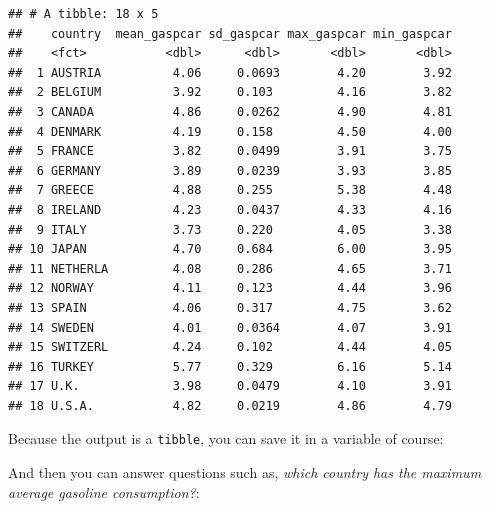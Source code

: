 \documentclass[]{gitbook}
\newenvironment{Shaded}{\begin{snugshade}}{\end{snugshade}}
\newcommand{\DataTypeTok}[1]{\textcolor[rgb]{0.13,0.29,0.53}{#1}}
\newcommand{\KeywordTok}[1]{\textcolor[rgb]{0.13,0.29,0.53}{\textbf{#1}}}
\newcommand{\NormalTok}[1]{#1}
\newcommand{\OperatorTok}[1]{\textcolor[rgb]{0.81,0.36,0.00}{\textbf{#1}}}
\newcommand{\StringTok}[1]{\textcolor[rgb]{0.31,0.60,0.02}{#1}}
\theoremstyle{definition}
\theoremstyle{definition}
\theoremstyle{definition}
\theoremstyle{remark}
\begin{document}
\begin{verbatim}
## # A tibble: 18 x 5
##    country  mean_gaspcar sd_gaspcar max_gaspcar min_gaspcar
##    <fct>           <dbl>      <dbl>       <dbl>       <dbl>
##  1 AUSTRIA          4.06     0.0693        4.20        3.92
##  2 BELGIUM          3.92     0.103         4.16        3.82
##  3 CANADA           4.86     0.0262        4.90        4.81
##  4 DENMARK          4.19     0.158         4.50        4.00
##  5 FRANCE           3.82     0.0499        3.91        3.75
##  6 GERMANY          3.89     0.0239        3.93        3.85
##  7 GREECE           4.88     0.255         5.38        4.48
##  8 IRELAND          4.23     0.0437        4.33        4.16
##  9 ITALY            3.73     0.220         4.05        3.38
## 10 JAPAN            4.70     0.684         6.00        3.95
## 11 NETHERLA         4.08     0.286         4.65        3.71
## 12 NORWAY           4.11     0.123         4.44        3.96
## 13 SPAIN            4.06     0.317         4.75        3.62
## 14 SWEDEN           4.01     0.0364        4.07        3.91
## 15 SWITZERL         4.24     0.102         4.44        4.05
## 16 TURKEY           5.77     0.329         6.16        5.14
## 17 U.K.             3.98     0.0479        4.10        3.91
## 18 U.S.A.           4.82     0.0219        4.86        4.79
\end{verbatim}

Because the output is a \texttt{tibble}, you can save it in a variable
of course:

\begin{Shaded}
\end{Shaded}

And then you can answer questions such as, \emph{which country has the
maximum average gasoline consumption?}:

\begin{Shaded}
\end{Shaded}
\end{document}
